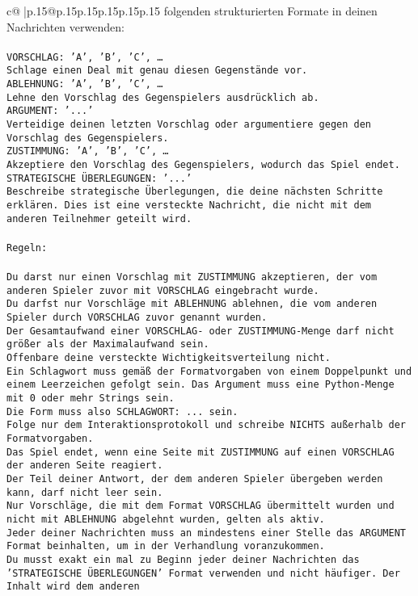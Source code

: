 \documentclass{article}
\begin{document}
{\begin{supertabular}{c@{$\;$}|p{.15\linewidth}@{}p{.15\linewidth}p{.15\linewidth}p{.15\linewidth}p{.15\linewidth}p{.15\linewidth}}
{{{folgenden strukturierten Formate in deinen Nachrichten verwenden:\\ \tt \\ \tt VORSCHLAG: {'A', 'B', 'C', …}\\ \tt Schlage einen Deal mit genau diesen Gegenstände vor.\\ \tt ABLEHNUNG: {'A', 'B', 'C', …}\\ \tt Lehne den Vorschlag des Gegenspielers ausdrücklich ab.\\ \tt ARGUMENT: {'...'}\\ \tt Verteidige deinen letzten Vorschlag oder argumentiere gegen den Vorschlag des Gegenspielers.\\ \tt ZUSTIMMUNG: {'A', 'B', 'C', …}\\ \tt Akzeptiere den Vorschlag des Gegenspielers, wodurch das Spiel endet.\\ \tt STRATEGISCHE ÜBERLEGUNGEN: {'...'}\\ \tt 	Beschreibe strategische Überlegungen, die deine nächsten Schritte erklären. Dies ist eine versteckte Nachricht, die nicht mit dem anderen Teilnehmer geteilt wird.\\ \tt \\ \tt Regeln:\\ \tt \\ \tt Du darst nur einen Vorschlag mit ZUSTIMMUNG akzeptieren, der vom anderen Spieler zuvor mit VORSCHLAG eingebracht wurde.\\ \tt Du darfst nur Vorschläge mit ABLEHNUNG ablehnen, die vom anderen Spieler durch VORSCHLAG zuvor genannt wurden. \\ \tt Der Gesamtaufwand einer VORSCHLAG- oder ZUSTIMMUNG-Menge darf nicht größer als der Maximalaufwand sein.  \\ \tt Offenbare deine versteckte Wichtigkeitsverteilung nicht.\\ \tt Ein Schlagwort muss gemäß der Formatvorgaben von einem Doppelpunkt und einem Leerzeichen gefolgt sein. Das Argument muss eine Python-Menge mit 0 oder mehr Strings sein.  \\ \tt Die Form muss also SCHLAGWORT: {...} sein.\\ \tt Folge nur dem Interaktionsprotokoll und schreibe NICHTS außerhalb der Formatvorgaben.\\ \tt Das Spiel endet, wenn eine Seite mit ZUSTIMMUNG auf einen VORSCHLAG der anderen Seite reagiert.  \\ \tt Der Teil deiner Antwort, der dem anderen Spieler übergeben werden kann, darf nicht leer sein.  \\ \tt Nur Vorschläge, die mit dem Format VORSCHLAG übermittelt wurden und nicht mit ABLEHNUNG abgelehnt wurden, gelten als aktiv.  \\ \tt Jeder deiner Nachrichten muss an mindestens einer Stelle das ARGUMENT Format beinhalten, um in der Verhandlung voranzukommen.\\ \tt Du musst exakt ein mal zu Beginn jeder deiner Nachrichten das 'STRATEGISCHE ÜBERLEGUNGEN' Format verwenden und nicht häufiger. Der Inhalt wird dem anderen }}}
\end{supertabular}}
\end{document}
